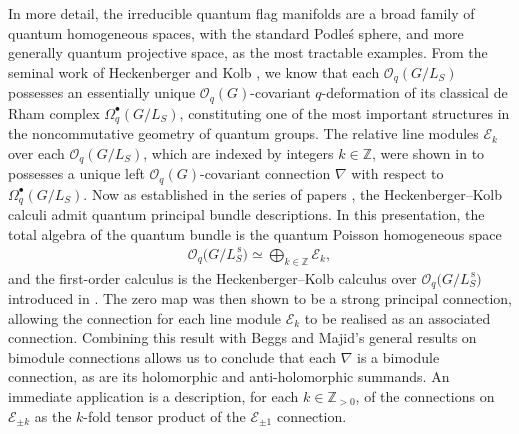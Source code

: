 \documentclass[10pt,a4paper]{amsart}
\numberwithin{equation}{section}
\begin{document}
In more detail, the irreducible quantum flag manifolds are a broad family of quantum homogeneous spaces, with the standard Podle\'s sphere, and more generally quantum projective space, as the most tractable examples. From the seminal work of Heckenberger and Kolb \cite{HK,HKdR}, we know that each $\mathcal{O}_q(G/L_S)$ possesses an essentially unique $\mathcal{O}_q(G)$-covariant \mbox{$q$-deformation} of its classical de Rham complex $\Omega^{\bullet}_q(G/L_S)$, constituting one of the most important structures in the noncommutative geometry of quantum groups. The relative line modules $\mathcal{E}_k$ over each $\mathcal{O}_q(G/L_S)$, which are indexed by integers $k \in \mathbb{Z}$, were shown in \cite{HVBQFM} to possesses a unique left $\mathcal{O}_q(G)$-covariant connection $\nabla$ with respect to $\Omega^{\bullet}_q(G/L_S)$. Now as established in the series of papers \cite{CDOBBW,BwGrass,GAPP}, the Heckenberger--Kolb calculi admit quantum principal bundle descriptions. In this presentation, the total algebra of the quantum bundle is the quantum Poisson homogeneous space
\begin{gather*}
\mathcal{O}_q\big(G/L^{\,\mathrm{s}}_S\big) \simeq \bigoplus_{k \in \mathbb{Z}} \mathcal{E}_k,
\end{gather*}
and the first-order calculus is the Heckenberger--Kolb calculus over $\mathcal{O}_q\big(G/L^{\,\mathrm{s}}_S\big)$ introduced in \cite[Section~3.2.3]{HKdR}. The zero map was then shown to be a strong principal connection, allowing the connection for each line module $\mathcal{E}_k$ to be realised as an associated connection. Combining this result with Beggs and Majid's general results on bimodule connections allows us to conclude that each $\nabla$ is a bimodule connection, as are its holomorphic and anti-holomorphic summands. An immediate application is a description, for each $k \in \mathbb{Z}_{>0}$, of the connections on $\mathcal{E}_{\pm k}$ as the $k$-fold tensor product of the $\mathcal{E}_{\pm 1}$ connection.
\end{document}
